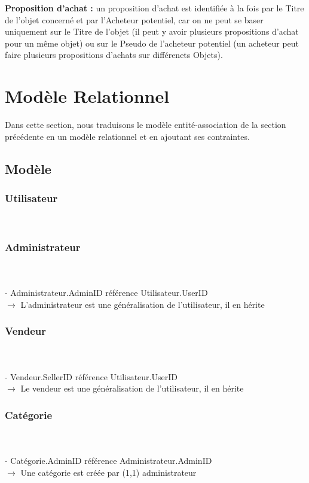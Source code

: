 \documentclass[a4paper,11pt]{article}
\begin{document}
\textbf{Proposition d'achat :} un proposition d'achat est identifiée à la fois par le Titre de l'objet concerné et par l'Acheteur potentiel,
car on ne peut se baser uniquement sur le Titre de l'objet (il peut y avoir plusieurs propositions d'achat pour un même objet)
ou sur le Pseudo de l'acheteur potentiel (un acheteur peut faire plusieurs propositions d'achats sur différenets Objets).

\section{Modèle Relationnel}
Dans cette section, nous traduisons le modèle entité-association de la section précédente en un modèle relationnel et en ajoutant ses contraintes.

\subsection{Modèle}

\indent

\subsubsection{Utilisateur}
\\


\subsubsection{Administrateur}
\\ \\
\indent - Administrateur.AdminID référence Utilisateur.UserID \\
\indent \indent $\rightarrow$ L'administrateur est une généralisation de l'utilisateur, il en hérite


\subsubsection{Vendeur} 
\\ \\
\indent - Vendeur.SellerID référence Utilisateur.UserID \\
\indent \indent $\rightarrow$ Le vendeur est une généralisation de l'utilisateur, il en hérite


\subsubsection{Catégorie}
\\ \\
\indent - Catégorie.AdminID référence Administrateur.AdminID\\
\indent \indent $\rightarrow$ Une catégorie est créée par (1,1) administrateur
\end{document}

